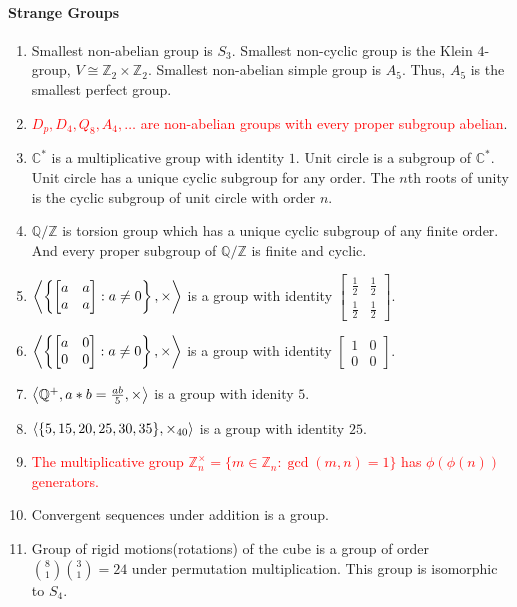 \paragraph{Strange Groups}
\begin{enumerate}
	\item Smallest non-abelian group is $S_3$.
	Smallest non-cyclic group is the Klein $4$-group, $V \cong \mathbb{Z}_2 \times \mathbb{Z}_2$.
	Smallest non-abelian simple group is $A_5$. Thus, $A_5$ is the smallest perfect group.
	\item \textcolor{red}{$D_p, D_4, Q_8, A_4,\dots$ are non-abelian groups with every proper subgroup abelian}. 
	\item $\mathbb{C}^\ast$ is a multiplicative group with identity $1$.
	Unit circle is a subgroup of $\mathbb{C}^\ast$.
	Unit circle has a unique cyclic subgroup for any order.
	The $n$th roots of unity is the cyclic subgroup of unit circle with order $n$.
	\item $\mathbb{Q}/\mathbb{Z}$ is torsion group which has a unique cyclic subgroup of any finite order.
	And every proper subgroup of $\mathbb{Q}/\mathbb{Z}$ is finite and cyclic.
	\item $ \left\langle \left\{ \begin{bmatrix} a & a \\ a & a \end{bmatrix} : a \ne 0 \right\},\times \right\rangle$ is a group with identity $\begin{bmatrix} \frac{1}{2} & \frac{1}{2} \\ \frac{1}{2} & \frac{1}{2} \end{bmatrix}$.
	\item $ \left\langle \left\{ \begin{bmatrix} a & 0 \\ 0 & 0 \end{bmatrix} : a \ne 0 \right\},\times \right\rangle$ is a group with identity $\begin{bmatrix} 1 & 0 \\ 0 & 0 \end{bmatrix}$.
	\item $\left\langle \mathbb{Q}^+,a \ast b = \frac{ab}{5},\times \right\rangle$ is a group with idenity $5$.
	\item $\left\langle \{5,15,20,25,30,35\},\times_{40} \right\rangle$ is a group with identity $25$.
	\item \textcolor{red}{The multiplicative group $\mathbb{Z}_n^\times = \{ m \in \mathbb{Z}_n : \gcd(m,n)=1 \}$ has $\phi(\phi(n))$ generators.}
	\item Convergent sequences under addition is a group.
	\item Group of rigid motions(rotations) of the cube is a group of order $\binom{8}{1}\binom{3}{1}=24$ under permutation multiplication.
	This group is isomorphic to $S_4$.
\end{enumerate}

